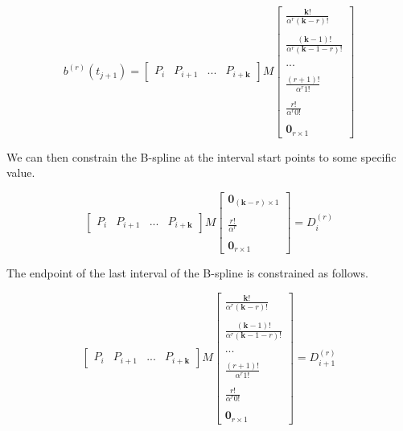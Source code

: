 \documentclass{article}
\begin{document}
\begin{equation}
    b^{(r)}(t_{j+1}) = \begin{bmatrix} P_{i} & P_{i+1} & ... & P_{i+\textbf{k}}\end{bmatrix} M \begin{bmatrix}
    \frac{\textbf{k}!}{ \alpha^{r} (\textbf{k}-r)!} \\ \\ 
    \frac{ (\textbf{k}-1)!}{ \alpha^{r} (\textbf{k}-1-r)!} \\ \\ 
    ... \\ \\ 
    \frac{(r+1)!}{\alpha^{r} 1!} \\ \\ 
    \frac{r!}{\alpha^r 0!} \\ \\ 
    \textbf{0}_{r \times 1} \end{bmatrix}
\end{equation}

We can then constrain the B-spline at the interval start points to some specific value.

\begin{equation}
    \begin{bmatrix} P_{i} & P_{i+1} & ... & P_{i+\textbf{k}}\end{bmatrix} M \begin{bmatrix} \textbf{0}_{(\textbf{k}-r) \times 1} \\ \\ \frac{r!}{\alpha^r} \\ \\ \textbf{0}_{r \times 1} \end{bmatrix} = D_{i}^{(r)}
\end{equation}

The endpoint of the last interval of the B-spline is constrained as follows.

\begin{equation}
    \begin{bmatrix} P_{i} & P_{i+1} & ... & P_{i+\textbf{k}}\end{bmatrix} M \begin{bmatrix}
    \frac{\textbf{k}!}{ \alpha^{r} (\textbf{k}-r)!} \\ \\ 
    \frac{ (\textbf{k}-1)!}{ \alpha^{r} (\textbf{k}-1-r)!} \\ \\ 
    ... \\ \\ 
    \frac{(r+1)!}{\alpha^{r} 1!} \\ \\ 
    \frac{r!}{\alpha^r 0!} \\ \\ 
    \textbf{0}_{r \times 1} \end{bmatrix} = D_{i+1}^{(r)}
\end{equation}
\end{document}
